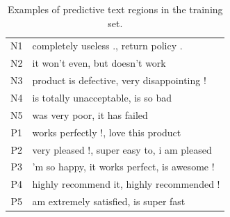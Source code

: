 \documentclass[11pt,letterpaper]{article}
\newcommand{\scnn}{seq-CNN}
\newcommand{\Elec}{Elec}
\begin{document}
\begin{table}
\begin{center}
\begin{footnotesize}
\begin{tabular}{|c|p{2.5in}|} 
\hline
{\small N1} & {\small completely useless ., return policy .} \\
{\small N2} & {\small it won't even, but doesn't work} \\
{\small N3} & {\small product is defective, very disappointing !} \\
{\small N4} & {\small is totally unacceptable, is so bad} \\
{\small N5} & {\small was very poor, it has failed} \\
\hline
{\small P1} & {\small works perfectly !, love this product} \\
{\small P2} & {\small very pleased !, super easy to, i am pleased} \\
{\small P3} & {\small 'm so happy, it works perfect, is awesome !} \\
{\small P4} & {\small highly recommend it, highly recommended !} \\  %
{\small P5} & {\small am extremely satisfied, is super fast} \\
\hline
\end{tabular}
\end{footnotesize}
\vspace{-0.1in}
\caption{ \label{tab:bv} \small
Examples of predictive text regions in the training set. 
}
\end{center}
\end{table}
\end{document}
